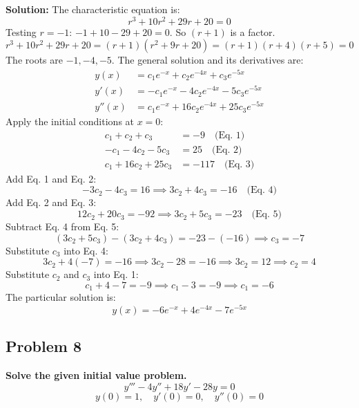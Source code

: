 \documentclass[11pt, a4paper]{article}
\theoremstyle{definition}
\theoremstyle{remark}
\begin{document}
\textbf{Solution:}
The characteristic equation is:
\[ r^3 + 10r^2 + 29r + 20 = 0 \]
Testing $r = -1$: $-1 + 10 - 29 + 20 = 0$. So $(r + 1)$ is a factor.
\[ r^3 + 10r^2 + 29r + 20 = (r + 1)(r^2 + 9r + 20) = (r + 1)(r + 4)(r + 5) = 0 \]
The roots are $-1, -4, -5$. The general solution and its derivatives are:
\begin{align*}
    y(x) &= c_1 e^{-x} + c_2 e^{-4x} + c_3 e^{-5x} \\
    y'(x) &= -c_1 e^{-x} - 4c_2 e^{-4x} - 5c_3 e^{-5x} \\
    y''(x) &= c_1 e^{-x} + 16c_2 e^{-4x} + 25c_3 e^{-5x}
\end{align*}
Apply the initial conditions at $x = 0$:
\begin{align*}
    c_1 + c_2 + c_3 &= -9 \quad \text{(Eq. 1)} \\
    -c_1 - 4c_2 - 5c_3 &= 25 \quad \text{(Eq. 2)} \\
    c_1 + 16c_2 + 25c_3 &= -117 \quad \text{(Eq. 3)}
\end{align*}
Add Eq. 1 and Eq. 2:
\[ -3c_2 - 4c_3 = 16 \implies 3c_2 + 4c_3 = -16 \quad \text{(Eq. 4)} \]
Add Eq. 2 and Eq. 3:
\[ 12c_2 + 20c_3 = -92 \implies 3c_2 + 5c_3 = -23 \quad \text{(Eq. 5)} \]
Subtract Eq. 4 from Eq. 5:
\[ (3c_2 + 5c_3) - (3c_2 + 4c_3) = -23 - (-16) \implies c_3 = -7 \]
Substitute $c_3$ into Eq. 4:
\[ 3c_2 + 4(-7) = -16 \implies 3c_2 - 28 = -16 \implies 3c_2 = 12 \implies c_2 = 4 \]
Substitute $c_2$ and $c_3$ into Eq. 1:
\[ c_1 + 4 - 7 = -9 \implies c_1 - 3 = -9 \implies c_1 = -6 \]
The particular solution is:
\[ y(x) = -6e^{-x} + 4e^{-4x} - 7e^{-5x} \]

\subsection*{Problem 8}
\textbf{Solve the given initial value problem.}
\[ y''' - 4y'' + 18y' - 28y = 0 \]
\[ y(0) = 1, \quad y'(0) = 0, \quad y''(0) = 0 \]
\end{document}
